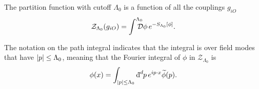 The partition function with cutoff $\Lambda_0$ is a function of all the couplings $g_{iO}$
\begin{equation}
  \mathcal{Z}_{\Lambda_0} (g_{iO}) = \int^{\mathrlap{\Lambda_0}} \pdd{\phi} e^{-S_{\Lambda_0}[\phi]}.
\end{equation}

The notation on the path integral indicates that the integral is over field modes that have $\abs{p} \leq \Lambda_0$, meaning that the Fourier integral of $\phi$  in $\mathcal{Z}_{\Lambda_0}$ is
\begin{equation}
  \phi(x) = \int_{\abs{p} \leq \Lambda_0} \bdd[d]{p} e^{i p \cdot x} \widetilde{\phi}(p).
\end{equation}
